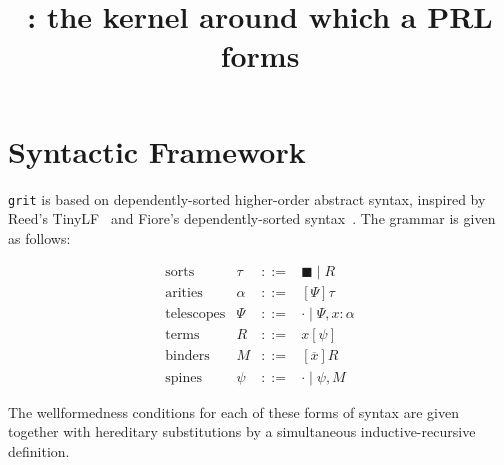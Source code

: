 \documentclass{article}
\title{\Grit: the kernel around which a PRL forms}
\author{}
\date{}
\newcommand\Grit{\texttt{grit}}
\newcommand\TinyLF{TinyLF}
\renewcommand\vec[1]{\overline{#1}}
\newcommand\SORT{\blacksquare}
\newcommand\Ar[2]{[#1]#2}
\newcommand\TlNil{\cdot}
\newcommand\TlSnoc[3]{#1,#2:#3}
\newcommand\SpNil{\cdot}
\newcommand\SpSnoc[2]{#1,#2}
\newcommand\Ap[2]{#1[#2]}
\newcommand\Abs[2]{[#1]#2}
\newcommand\WfSrt[2]{{#1}\vdash{#2}\;\textit{sort}}
\newcommand\WfAr[2]{{#1}\vdash{#2}\;\textit{arity}}
\newcommand\WfTl[2]{{#1}\vdash{#2}\;\textit{tele}}
\newcommand\WfTm[3]{{#1}\vdash{#2}\Rightarrow{#3}}
\newcommand\WfSp[3]{{#1}\vdash{#2}\Leftarrow{#3}}
\newcommand\WfBnd[3]{{#1}\vdash{#2}\Leftarrow{#3}}
\newcommand\HSubst[3]{[#1/#2]#3}
\begin{document}
\maketitle

\section{Syntactic Framework}

\Grit{} is based on dependently-sorted higher-order abstract syntax,
inspired by Reed's \TinyLF{}~\cite{reed:2007} and Fiore's
dependently-sorted syntax~\cite{fiore:2008}. The grammar is given as
follows:

\[
  \begin{array}{llll}
    \text{sorts}
    &\tau
    &::=
    &\SORT\mid R
    \\
    \text{arities}
    &\alpha
    &::=
    &\Ar{\Psi}{\tau}
    \\
    \text{telescopes}
    &\Psi
    &::=
    &\TlNil\mid\TlSnoc{\Psi}{x}{\alpha}
    \\
    \text{terms}
    &R
    &::=
    &\Ap{x}{\psi}
    \\
    \text{binders}
    &M
    &::=
    &\Abs{\vec{x}}{R}
    \\
    \text{spines}
    &\psi
    &::=
    &\cdot\mid\SpSnoc{\psi}{M}
  \end{array}
\]

The wellformedness conditions for each of these forms of syntax are
given together with hereditary substitutions by a simultaneous
inductive-recursive definition.
\end{document}
